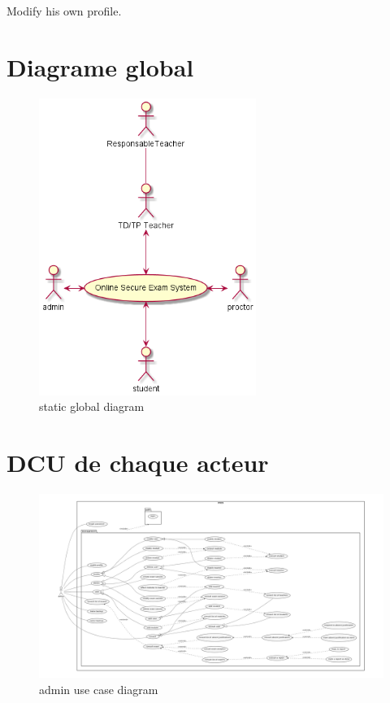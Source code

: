 \documentclass[a4paper,12p]{article}
\begin{document}
     \item Modify his own profile.

     \section{Diagrame global }
     \begin{figure}[h]
         \centering
         \includegraphics[width=200pt]{SCD}
         \caption{static global diagram}
     \end{figure}
     \clearpage
     \section{DCU de chaque acteur}
     \vspace{5cm} %

    \begin{figure}[h]
        \centering
        \includegraphics[width=\textwidth]{admin_UCD}
        \caption{admin use case diagram}
    \end{figure}
\end{document}
